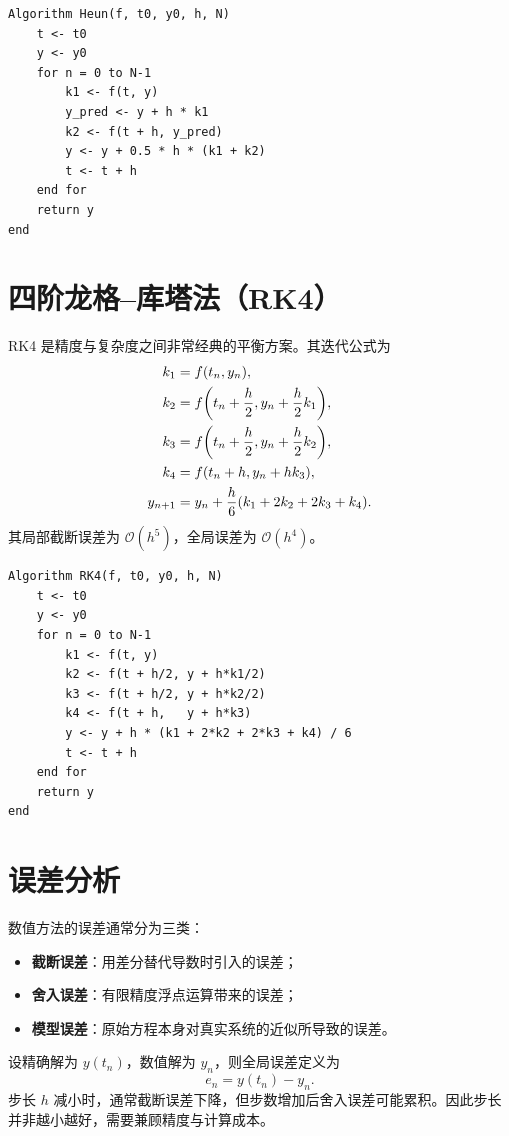 \begin{lstlisting}
Algorithm Heun(f, t0, y0, h, N)
    t <- t0
    y <- y0
    for n = 0 to N-1
        k1 <- f(t, y)
        y_pred <- y + h * k1
        k2 <- f(t + h, y_pred)
        y <- y + 0.5 * h * (k1 + k2)
        t <- t + h
    end for
    return y
end
\end{lstlisting}

\section{四阶龙格--库塔法（RK4）}
RK4 是精度与复杂度之间非常经典的平衡方案。其迭代公式为
\[
\begin{aligned}
  k_1&=f(t_n,y_n),\\
  k_2&=f\qty(t_n+\frac{h}{2},y_n+\frac{h}{2}k_1),\\
  k_3&=f\qty(t_n+\frac{h}{2},y_n+\frac{h}{2}k_2),\\
  k_4&=f(t_n+h,y_n+hk_3),\\
  y_{n+1}&=y_n+\frac{h}{6}(k_1+2k_2+2k_3+k_4).
\end{aligned}
\]
其局部截断误差为 $\mathcal{O}(h^5)$，全局误差为 $\mathcal{O}(h^4)$。

\begin{lstlisting}
Algorithm RK4(f, t0, y0, h, N)
    t <- t0
    y <- y0
    for n = 0 to N-1
        k1 <- f(t, y)
        k2 <- f(t + h/2, y + h*k1/2)
        k3 <- f(t + h/2, y + h*k2/2)
        k4 <- f(t + h,   y + h*k3)
        y <- y + h * (k1 + 2*k2 + 2*k3 + k4) / 6
        t <- t + h
    end for
    return y
end
\end{lstlisting}

\section{误差分析}

数值方法的误差通常分为三类：
\begin{itemize}
  \item \textbf{截断误差}：用差分替代导数时引入的误差；
  \item \textbf{舍入误差}：有限精度浮点运算带来的误差；
  \item \textbf{模型误差}：原始方程本身对真实系统的近似所导致的误差。
\end{itemize}

设精确解为 $y(t_n)$，数值解为 $y_n$，则全局误差定义为
\[
 e_n=y(t_n)-y_n.
\]
步长 $h$ 减小时，通常截断误差下降，但步数增加后舍入误差可能累积。因此步长并非越小越好，需要兼顾精度与计算成本。

